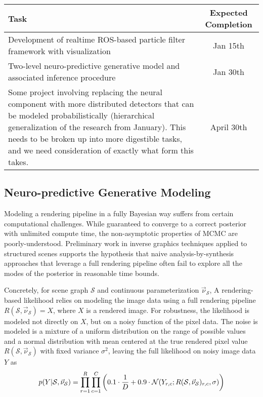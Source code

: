   \begin{table}[h]
    \begin{tabularx}{\textwidth}{|X|c|}
      \hline
      \textbf{Task} & \textbf{Expected Completion} \\
      \hline
      Development of realtime ROS-based particle filter framework with visualization & Jan 15th \\
      \hline
      Two-level neuro-predictive generative model and associated inference procedure & Jan 30th \\
      \hline
      Some project involving replacing the neural component with more distributed detectors that can be modeled probabilistically (hierarchical generalization of the research from January). This needs to be broken up into more digestible tasks, and we need consideration of exactly what form this takes. & April 30th \\
      \hline
    \end{tabularx}
  \end{table}



  \subsection{Neuro-predictive Generative Modeling}

    Modeling a rendering pipeline in a fully Bayesian way suffers from certain
    computational challenges. While guaranteed to converge to a correct
    posterior with unlimited compute time, the non-asymptotic properties of
    MCMC are poorly-understood. Preliminary work in inverse graphics techniques
    applied to structured scenes supports the hypothesis that naive
    analysis-by-synthesis approaches that leverage a full rendering pipeline
    often fail to explore all the modes of the posterior in reasonable time bounds.

    Concretely, for scene graph $\mathcal{S}$ and continuous parameterization
    $\vec{\nu}_\mathcal{S}$, A rendering-based likelihood relies on modeling
    the image data using a full rendering pipeline $R(\mathcal{S},
    \vec{\nu}_\mathcal{S}) = X$, where $X$ is a rendered image. For robustness,
    the likelihood is modeled not directly on $X$, but on a noisy function of
    the pixel data. The noise is modeled is a mixture of a uniform distribution
    on the range of possible values and a normal distribution with mean
    centered at the true rendered pixel value $R(\mathcal{S},
    \vec{\nu}_\mathcal{S})$ with fixed variance $\sigma^2$, leaving the full
    likelihood on noisy image data $Y$ as
    \begin{equation} \label{eq:1.1}
      p(Y | \mathcal{S}, \vec{\nu}_\mathcal{S}) = \prod_{r=1}^R\prod_{c=1}^C \left( 0.1 \cdot \frac{1}{D} + 0.9 \cdot \mathcal{N}(Y_{r,c}; R(\mathcal{S}, \vec{\nu}_\mathcal{S})_{r,c},\sigma) \right)
    \end{equation}

